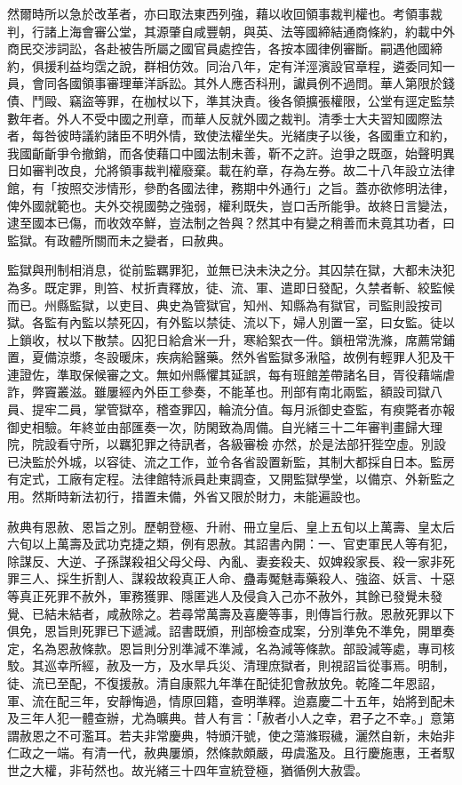 \begin{pinyinscope}
然爾時所以急於改革者，亦曰取法東西列強，藉以收回領事裁判權也。考領事裁判，行諸上海會審公堂，其源肇自咸豐朝，與英、法等國締結通商條約，約載中外商民交涉詞訟，各赴被告所屬之國官員處控告，各按本國律例審斷。嗣遇他國締約，俱援利益均霑之說，群相仿效。同治八年，定有洋涇濱設官章程，遴委同知一員，會同各國領事審理華洋訴訟。其外人應否科刑，讞員例不過問。華人第限於錢債、鬥毆、竊盜等罪，在枷杖以下，準其決責。後各領擴張權限，公堂有逕定監禁數年者。外人不受中國之刑章，而華人反就外國之裁判。清季士大夫習知國際法者，每咎彼時議約諸臣不明外情，致使法權坐失。光緒庚子以後，各國重立和約，我國齗齗爭令撤銷，而各使藉口中國法制未善，靳不之許。迨爭之既亟，始聲明異日如審判改良，允將領事裁判權廢棄。載在約章，存為左券。故二十八年設立法律館，有「按照交涉情形，參酌各國法律，務期中外通行」之旨。蓋亦欲修明法律，俾外國就範也。夫外交視國勢之強弱，權利既失，豈口舌所能爭。故終日言變法，逮至國本已傷，而收效卒鮮，豈法制之咎與？然其中有變之稍善而未竟其功者，曰監獄。有政體所關而未之變者，曰赦典。

監獄與刑制相消息，從前監羈罪犯，並無已決未決之分。其囚禁在獄，大都未決犯為多。既定罪，則笞、杖折責釋放，徒、流、軍、遣即日發配，久禁者斬、絞監候而已。州縣監獄，以吏目、典史為管獄官，知州、知縣為有獄官，司監則設按司獄。各監有內監以禁死囚，有外監以禁徒、流以下，婦人別置一室，曰女監。徒以上鎖收，杖以下散禁。囚犯日給倉米一升，寒給絮衣一件。鎖杻常洗滌，席薦常鋪置，夏備涼漿，冬設暖床，疾病給醫藥。然外省監獄多湫隘，故例有輕罪人犯及干連證佐，準取保候審之文。無如州縣懼其延誤，每有班館差帶諸名目，胥役藉端虐詐，弊竇叢滋。雖屢經內外臣工參奏，不能革也。刑部有南北兩監，額設司獄八員、提牢二員，掌管獄卒，稽查罪囚，輪流分值。每月派御史查監，有瘐斃者亦報御史相驗。年終並由部匯奏一次，防閑致為周備。自光緒三十二年審判畫歸大理院，院設看守所，以羈犯罪之待訊者，各級審檢亦然，於是法部犴狴空虛。別設已決監於外城，以容徒、流之工作，並令各省設置新監，其制大都採自日本。監房有定式，工廠有定程。法律館特派員赴東調查，又開監獄學堂，以備京、外新監之用。然斯時新法初行，措置未備，外省又限於財力，未能遍設也。

赦典有恩赦、恩旨之別。歷朝登極、升祔、冊立皇后、皇上五旬以上萬壽、皇太后六旬以上萬壽及武功克捷之類，例有恩赦。其詔書內開：一、官吏軍民人等有犯，除謀反、大逆、子孫謀殺祖父母父母、內亂、妻妾殺夫、奴婢殺家長、殺一家非死罪三人、採生折割人、謀殺故殺真正人命、蠱毒魘魅毒藥殺人、強盜、妖言、十惡等真正死罪不赦外，軍務獲罪、隱匿逃人及侵貪入己亦不赦外，其餘已發覺未發覺、已結未結者，咸赦除之。若尋常萬壽及喜慶等事，則傳旨行赦。恩赦死罪以下俱免，恩旨則死罪已下遞減。詔書既頒，刑部檢查成案，分別準免不準免，開單奏定，名為恩赦條款。恩旨則分別準減不準減，名為減等條款。部設減等處，專司核駮。其巡幸所經，赦及一方，及水旱兵災、清理庶獄者，則視詔旨從事焉。明制，徒、流已至配，不復援赦。清自康熙九年準在配徒犯會赦放免。乾隆二年恩詔，軍、流在配三年，安靜悔過，情原回籍，查明準釋。迨嘉慶二十五年，始將到配未及三年人犯一體查辦，尤為曠典。昔人有言：「赦者小人之幸，君子之不幸。」意第謂赦恩之不可濫耳。若夫非常慶典，特頒汗號，使之蕩滌瑕穢，灑然自新，未始非仁政之一端。有清一代，赦典屢頒，然條款頗嚴，毋虞濫及。且行慶施惠，王者馭世之大權，非茍然也。故光緒三十四年宣統登極，猶循例大赦雲。


\end{pinyinscope}